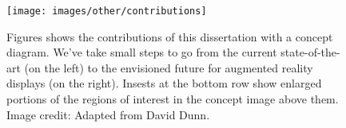 \begin{figure}[h!]
\centering
\texttt{[image: images/other/contributions]}
\caption[Contributions of this dissertation]{Figures shows the contributions of this dissertation with a concept diagram. We've take small steps to go from the current state-of-the-art (on the left) to the envisioned future for augmented reality displays (on the right). Insests at the bottom row show enlarged portions of the regions of interest in the concept image above them. Image credit: Adapted from David Dunn.}
\label{fig:contributions}
\end{figure}

